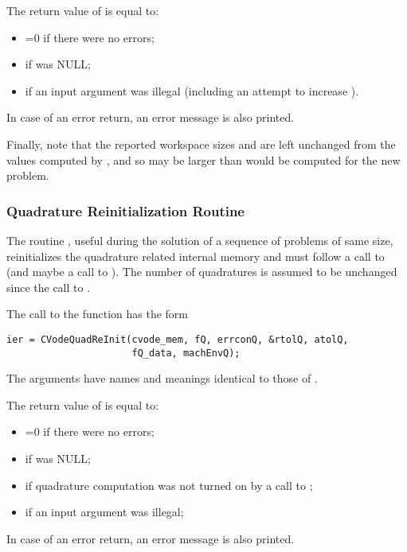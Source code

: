 The return value  of  is equal to: 
\begin{itemize}
\item {}=0 if there were no errors; 
\item {} if  was NULL;
\item {} if an input argument was illegal    
      (including an attempt to increase ).
\end{itemize}
In case of an error return, an error message is also printed.  

Finally, note that the reported workspace sizes \id{[LENRW]} 
and \id{[LENIW]} are left unchanged from the values computed 
by , and so may be larger than would be computed for 
the new problem.

\subsubsection{Quadrature Reinitialization Routine}\label{sss:cvqreinit}

The routine , useful during the solution of a sequence of problems of 
same size, reinitializes the quadrature related internal memory 
and must follow a call to  (and maybe a call to ). 
The number  of quadratures is assumed to be unchanged since the call to 
.

The call to the  function has the form
\begin{verbatim}
ier = CVodeQuadReInit(cvode_mem, fQ, errconQ, &rtolQ, atolQ, 
                      fQ_data, machEnvQ);
\end{verbatim}
The arguments have names and meanings identical to those of .

The return value  of  is equal to: 
\begin{itemize}
\item {}=0 if there were no errors; 
\item {} if  was NULL;
\item {} if quadrature computation was not turned on
      by a call to ;
\item {} if an input argument was illegal;
\end{itemize}
In case of an error return, an error message is also printed.  

